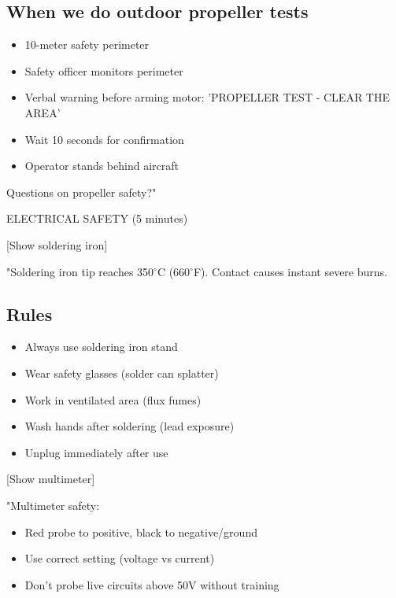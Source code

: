\documentclass[11pt,letterpaper]{article}
\begin{document}
{\subsection{When we do outdoor propeller tests}

\begin{itemize}
  \item 10-meter safety perimeter
  \item Safety officer monitors perimeter
  \item Verbal warning before arming motor: 'PROPELLER TEST - CLEAR THE AREA'
  \item Wait 10 seconds for confirmation
  \item Operator stands behind aircraft
\end{itemize}

Questions on propeller safety?"\par

ELECTRICAL SAFETY (5 minutes)\par

[Show soldering iron]\par

"Soldering iron tip reaches 350$^\circ$C (660$^\circ$F). Contact causes instant severe burns.\par

\subsection{Rules}

\begin{itemize}
  \item Always use soldering iron stand
  \item Wear safety glasses (solder can splatter)
  \item Work in ventilated area (flux fumes)
  \item Wash hands after soldering (lead exposure)
  \item Unplug immediately after use
\end{itemize}

[Show multimeter]\par

"Multimeter safety:\par

\begin{itemize}
  \item Red probe to positive, black to negative/ground
  \item Use correct setting (voltage vs current)
  \item Don't probe live circuits above 50V without training
\end{itemize}

}
\end{document}
